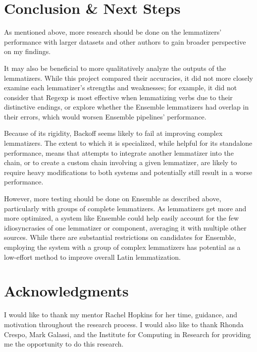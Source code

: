 \documentclass[11pt]{article}
\begin{document}
\section{Conclusion \& Next Steps}

As mentioned above, more research should be done on the lemmatizers’ performance with larger datasets and other authors to gain broader perspective on my findings.

It may also be beneficial to more qualitatively analyze the outputs of the lemmatizers. While this project compared their accuracies, it did not more closely examine each lemmatizer’s strengths and weaknesses; for example, it did not consider that Regexp is most effective when lemmatizing verbs due to their distinctive endings, or explore whether the Ensemble lemmatizers had overlap in their errors, which would worsen Ensemble pipelines’ performance.

Because of its rigidity, Backoff seems likely to fail at improving complex lemmatizers. The extent to which it is specialized, while helpful for its standalone performance, means that attempts to integrate another lemmatizer into the chain, or to create a custom chain involving a given lemmatizer, are likely to require heavy modifications to both systems and potentially still result in a worse performance.

However, more testing should be done on Ensemble as described above, particularly with groups of complete lemmatizers. As lemmatizers get more and more optimized, a system like Ensemble could help easily account for the few idiosyncrasies of one lemmatizer or component, averaging it with multiple other sources. While there are substantial restrictions on candidates for Ensemble, employing the system with a group of complex lemmatizers has potential as a low-effort method to improve overall Latin lemmatization.

\section{Acknowledgments}

I would like to thank my mentor Rachel Hopkins for her time, guidance, and motivation throughout the research process. I would also like to thank Rhonda Crespo, Mark Galassi, and the Institute for Computing in Research for providing me the opportunity to do this research.




\end{document}
